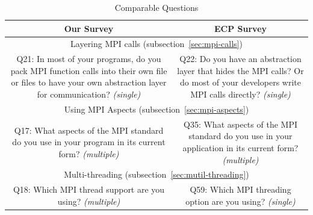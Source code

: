 \documentclass[preprint,5p,times]{elsarticle}
\begin{document}
\begin{table}[htb]%
  \begin{center}%
    \caption{Comparable Questions}%
    \label{tab:comparable-questions}%
    \begin{tabular}[t]{c|c}
      \hline
      Our Survey & ECP Survey \\
      \hline
      \hline
      \multicolumn{2}{c}{Layering MPI calls (subsection~\ref{sec:mpi-calls})} \\
      \hline
      \begin{minipage}[t]{0.45\hsize}
        Q21: In most of your programs, do you pack MPI function calls into
        their own file or files to have your own abstraction layer for
        communication?  {\it(single)}
      \end{minipage}
      &
      \begin{minipage}[t]{0.45\hsize}
        Q22: Do you have an abstraction layer that hides the MPI calls? Or do
        most of your developers write MPI calls directly? {\it(single)}
      \end{minipage}
      \\
      \hline
      \hline
      \multicolumn{2}{c}{Using MPI Aspects (subsection~\ref{sec:mpi-aspects})} \\
      \hline
      \begin{minipage}[t]{0.45\hsize}
        Q17: What aspects of the MPI standard do you use in your program in its
        current form? {\it(multiple)}
      \end{minipage}
      &
      \begin{minipage}[t]{0.45\hsize}
        Q35: What aspects of the MPI standard do you use in your application in
        its current form? {\it(multiple)}
      \end{minipage}
      \\
      \hline
      \hline
      \multicolumn{2}{c}{Multi-threading (subsection~\ref{sec:mutil-threading})} \\
      \hline
      \begin{minipage}[t]{0.45\hsize}
        Q18: Which MPI thread support are you using? {\it(multiple)}
      \end{minipage}
      &
      \begin{minipage}[t]{0.45\hsize}
        Q59: Which MPI threading option are you using? {\it(single)}
      \end{minipage}
      \\
      \hline
    \end{tabular}%
  \end{center}%
\end{table}%
\end{document}
